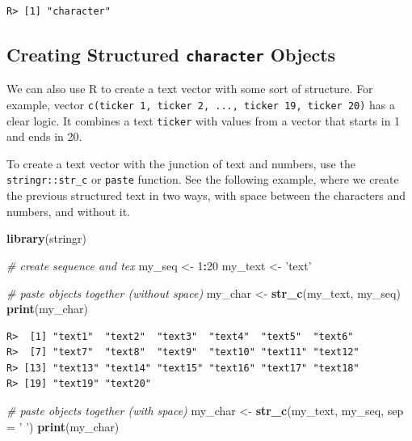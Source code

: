 \documentclass[
  12pt,
]{book}
\newenvironment{Shaded}{\begin{snugshade}}{\end{snugshade}}
\newcommand{\CommentTok}[1]{\textcolor[rgb]{0.37,0.37,0.37}{\textit{#1}}}
\newcommand{\DataTypeTok}[1]{\textcolor[rgb]{0.27,0.27,0.27}{#1}}
\newcommand{\DecValTok}[1]{\textcolor[rgb]{0.06,0.06,0.06}{#1}}
\newcommand{\KeywordTok}[1]{\textcolor[rgb]{0.27,0.27,0.27}{\textbf{#1}}}
\newcommand{\NormalTok}[1]{#1}
\newcommand{\OperatorTok}[1]{\textcolor[rgb]{0.43,0.43,0.43}{\textbf{#1}}}
\newcommand{\StringTok}[1]{\textcolor[rgb]{0.5,0.5,0.5}{#1}}
\begin{document}
\begin{verbatim}
R> [1] "character"
\end{verbatim}

\hypertarget{creating-structured-character-objects}{%
\subsection{\texorpdfstring{Creating Structured \texttt{character} Objects}{Creating Structured character Objects}}\label{creating-structured-character-objects}}

We can also use R to create a text vector with some sort of structure. For example, vector \texttt{c(\textquotesingle{}ticker\ 1\textquotesingle{},\ \textquotesingle{}ticker\ 2\textquotesingle{},\ ...,\ \textquotesingle{}ticker\ 19\textquotesingle{},\ \textquotesingle{}ticker\ 20\textquotesingle{})} has a clear logic. It combines a text \texttt{ticker} with values from a vector that starts in 1 and ends in 20.

To create a text vector with the junction of text and numbers, use the \texttt{stringr::str\_c} or \texttt{paste} function. See the following example, where we create the previous structured text in two ways, with space between the characters and numbers, and without it.  

\begin{Shaded}
\begin{Highlighting}[]
\KeywordTok{library}\NormalTok{(stringr)}

\CommentTok{# create sequence and tex}
\NormalTok{my_seq <-}\StringTok{ }\DecValTok{1}\OperatorTok{:}\DecValTok{20}
\NormalTok{my_text <-}\StringTok{ 'text'}

\CommentTok{# paste objects together (without space)}
\NormalTok{my_char <-}\StringTok{ }\KeywordTok{str_c}\NormalTok{(my_text, my_seq)}
\KeywordTok{print}\NormalTok{(my_char)}
\end{Highlighting}
\end{Shaded}

\begin{verbatim}
R>  [1] "text1"  "text2"  "text3"  "text4"  "text5"  "text6" 
R>  [7] "text7"  "text8"  "text9"  "text10" "text11" "text12"
R> [13] "text13" "text14" "text15" "text16" "text17" "text18"
R> [19] "text19" "text20"
\end{verbatim}

\begin{Shaded}
\begin{Highlighting}[]
\CommentTok{# paste objects together (with space)}
\NormalTok{my_char <-}\StringTok{ }\KeywordTok{str_c}\NormalTok{(my_text, }
\NormalTok{                 my_seq, }
                 \DataTypeTok{sep =} \StringTok{' '}\NormalTok{)}
\KeywordTok{print}\NormalTok{(my_char)}
\end{Highlighting}
\end{Shaded}
\end{document}
